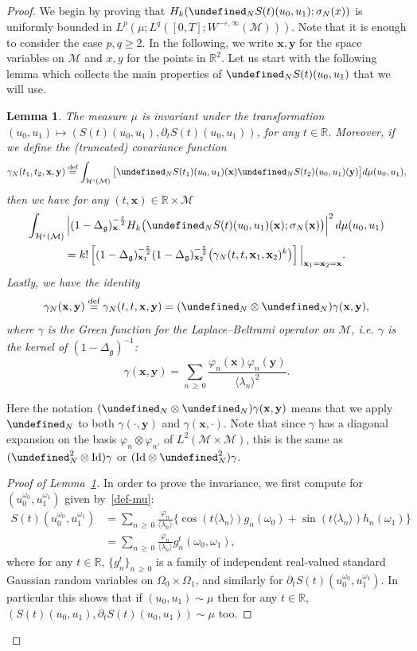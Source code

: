 \documentclass[10pt]{amsart}
\newtheorem{lemm}[theo]{Lemma}\newtheorem{prop}[theo]{Proposition}\newtheorem{coro}[theo]{Corollary}\newtheorem{conj}[theo]{Conjecture}
\theoremstyle{definition}\newtheorem{defi}[theo]{Definition}\newtheorem{rema}[theo]{Remark}\newtheorem{exam}[theo]{Example}\newtheorem{exem}[theo]{Example}\newtheorem{nota}[theo]{Notation}
\newcommand{\R}{\mathbb{R}}
\newcommand{\deff}{\overset{\textup{def}}{=}}
\let\P= \undefined
\newcommand{\P}{\mathbf{P}}
\newcommand{\x}{\mathbf{x}}
\newcommand{\y}{\mathbf{y}}
\newcommand{\M}{\mathcal{M}}
\renewcommand{\H}{\mathcal{H}}
\newcommand{\Id}{\mathrm{Id}}
\newcommand{\g}{\mathfrak{g}}
\newcommand{\ld}{\lambda}
\newcommand{\Dlg}{\Delta_{\g}}
\newcommand{\eps}{\varepsilon}
\newcommand{\s}{\sigma}
\newcommand{\dt}{\partial_t}
\renewcommand{\o}{\omega}
\renewcommand{\O}{\Omega}
\newcommand{\jb}[1] {\langle #1 \rangle}
\begin{document}
\begin{proof}
We begin by proving that $H_k(\P_NS(t)(u_0,u_1);\s_N(x))$ is uniformly bound\-ed in $L^p(\mu;L^q([0,T];W^{-\eps,\infty}(\M)))$. Note that it is enough to consider the case $p,q\ge 2$. In the following, we write $\x,\y$ for the space variables on $\M$ and $x,y$ for the points in $\R^2$. Let us start with the following lemma which collects the main properties of $\P_NS(t)(u_0,u_1)$ that we will use.

\begin{lemm}\label{lem-covar}
The measure $\mu$ is invariant under the transformation $(u_0,u_1)\mapsto (S(t)(u_0,u_1),\dt S(t)(u_0,u_1))$, for any $t\in\R$. Moreover, if we define the (truncated) covariance function
\begin{equation*}
\gamma_N(t_1,t_2,\x,\y)
\deff\int_{\H^s(\M)}\big[\P_NS(t_1)(u_0,u_1)(\x)\P_NS(t_2)(u_0,u_1)(\y)\big]d\mu(u_0,u_1),
\end{equation*}
then we have for any $(t,\x)\in \R\times\M$
\begin{multline}\label{keypoint}
\int_{\H^s(\M)}\left|(1-\Dlg)_\x^{-\frac\eps2}H_k\big(\P_NS(t)(u_0,u_1)(\x);\s_N(\x)\big)\right|^2d\mu(u_0,u_1)\\ 
=k!\left[(1-\Dlg)_{\x_1}^{-\frac\eps2}(1-\Dlg)_{\x_2}^{-\frac\eps2}\big(\gamma_N(t,t,\x_1,\x_2)^k\big)\right]\Big|_{\x_1=\x_2=\x}.
\end{multline}
Lastly, we have the identity
\begin{equation}\label{covarGreen}
\gamma_N(\x,\y)
\deff\gamma_N(t,t,\x,\y) = (\P_N\otimes\P_N)\gamma(\x,\y),
\end{equation}
where $\gamma$ is the Green function for the Laplace--Beltrami operator on $\M$, i.e. $ \gamma$ is the kernel of $(1-\Dlg)^{-1}$:
\begin{equation*}
\gamma(\x,\y)=\sum_{n\,\ge\,0}\frac{\varphi_n(\x)\varphi_n(\y)}{\jb{\ld_n}^2}.
\end{equation*}
\end{lemm}

Here the notation $(\P_N\otimes\P_N)\gamma(\x,\y)$ means that we apply $\P_N$ to both $\gamma(\cdot,\y)$ and $\gamma(\x,\cdot)$. Note that since $\gamma$ has a diagonal expansion on the basis $\varphi_n\otimes\varphi_{n'}$ of $L^2(\M\times\M)$, this is the same as $(\P_N^2\otimes\Id)\gamma$ or $(\Id\otimes\P_N^2)\gamma$.
\begin{proof}[Proof of Lemma~\ref{lem-covar}]
In order to prove the invariance, we first compute for $(u_0^{\o_0},u_1^{\o_1})$ given by~\eqref{def-mu}:
\begin{align*}
S(t)\left(u_0^{\o_0},u_1^{\o_1}\right) &= \sum_{n\,\geq\,0}\frac{\varphi_n}{\jb{\lambda_n}}\big\{\cos(t\jb{\lambda_n})g_n(\o_0)+\sin(t\jb{\lambda_n})h_n(\o_1)\big\}\\
&=\sum_{n\,\geq\,0}\frac{\varphi_n}{\jb{\lambda_n}}g_n^t(\o_0,\o_1),
\end{align*}
where for any $t\in\R$, $\{g_n^t\}_{n\,\ge\,0}$ is a family of independent real-valued standard Gaussian random variables on $\O_0\times\O_1$, and similarly for $\dt S(t)(u_0^{\o_0},u_1^{\o_1})$. In particular this shows that if $(u_0,u_1)\sim \mu$ then for any $t\in\R$, $(S(t)(u_0,u_1),\dt S(t)(u_0,u_1))\sim\mu$ too.


\end{proof}
\end{proof}
\end{document}
